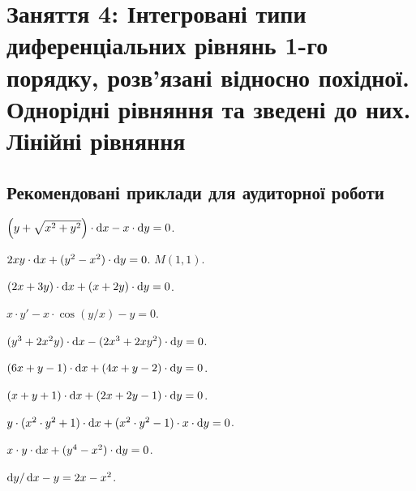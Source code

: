 \section*{Заняття 4: Інтегровані типи диференціальних рівнянь 1-го порядку, розв'язані відносно похідної. Однорідні рівняння та зведені до них. Лінійні рівняння}

\subsection*{Рекомендовані приклади для аудиторної роботи}

\begin{problem}
	$\left( y + \sqrt{x^2 + y^2} \right) \cdot \mathop{}\!\mathrm{d} x - x \cdot \mathop{}\!\mathrm{d} y = 0$.
\end{problem}

\begin{problem}
	$2 x y \cdot \mathop{}\!\mathrm{d} x + (y^2 - x^2) \cdot \mathop{}\!\mathrm{d} y = 0$.  $M(1,1)$.
\end{problem}

\begin{problem}
	$(2 x + 3 y) \cdot \mathop{}\!\mathrm{d} x + (x + 2 y) \cdot \mathop{}\!\mathrm{d} y = 0$.
\end{problem}

\begin{problem}
	$x \cdot y' - x \cdot \cos (y / x) - y = 0$.
\end{problem}

\begin{problem}
	$(y^3 + 2 x^2 y) \cdot \mathop{}\!\mathrm{d} x - (2 x^3 + 2 x y^2) \cdot \mathop{}\!\mathrm{d} y = 0$.
\end{problem}

\begin{problem}
	$(6 x + y - 1) \cdot \mathop{}\!\mathrm{d} x + (4 x + y - 2) \cdot \mathop{}\!\mathrm{d} y = 0$.
\end{problem}

\begin{problem}
	$(x + y + 1) \cdot \mathop{}\!\mathrm{d} x + (2 x + 2 y - 1) \cdot \mathop{}\!\mathrm{d} y = 0$.
\end{problem}

\begin{problem}
	$y \cdot (x^2 \cdot y^2 + 1) \cdot \mathop{}\!\mathrm{d} x + (x^2 \cdot y^2 - 1) \cdot x \cdot \mathop{}\!\mathrm{d} y = 0$.
\end{problem}

\begin{problem}
	$x \cdot y \cdot \mathop{}\!\mathrm{d} x + (y^4 - x^2) \cdot \mathop{}\!\mathrm{d} y = 0$.
\end{problem}

\begin{problem}
	$\mathop{}\!\mathrm{d} y / \mathop{}\!\mathrm{d} x - y = 2 x - x^2$.
\end{problem}

